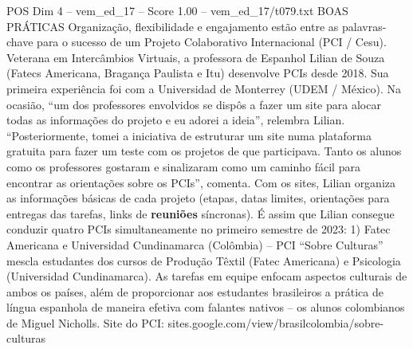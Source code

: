 \begin{textsample}{POS Dim 4 – vem\_ed\_17 – Score 1.00 – vem\_ed\_17/t079.txt}  \label{ex:f4_pos_087}
BOAS PRÁTICAS Organização, flexibilidade e engajamento estão entre as palavras-chave para o sucesso de um Projeto Colaborativo Internacional (PCI / Cesu).
Veterana em Intercâmbios Virtuais, a professora de Espanhol Lilian de Souza (Fatecs Americana, Bragança Paulista e Itu) desenvolve PCIs desde 2018.
Sua primeira experiência foi com a Universidad de Monterrey (UDEM / México).
Na ocasião, “um dos professores envolvidos se dispôs a fazer um site para alocar todas as informações do projeto e eu adorei a ideia”, relembra Lilian. “Posteriormente, tomei a iniciativa de estruturar um site numa plataforma gratuita para fazer um teste com os projetos de que participava.
Tanto os alunos como os professores gostaram e sinalizaram como um caminho fácil para encontrar as orientações sobre os PCIs”, comenta.
Com os sites, Lilian organiza as informações básicas de cada projeto (etapas, datas limites, orientações para entregas das tarefas, links de \textbf{reuniões} síncronas).
É assim que Lilian consegue conduzir quatro PCIs simultaneamente no primeiro semestre de 2023: 1) Fatec Americana e Universidad Cundinamarca (Colômbia) – PCI “Sobre Culturas” mescla estudantes dos cursos de Produção Têxtil (Fatec Americana) e Psicologia (Universidad Cundinamarca).
As tarefas em equipe enfocam aspectos culturais de ambos os países, além de proporcionar aos estudantes brasileiros a prática de língua espanhola de maneira efetiva com falantes nativos – os alunos colombianos de Miguel Nicholls.
Site do PCI: sites.google.com/view/brasilcolombia/sobre-culturas

\end{textsample}
